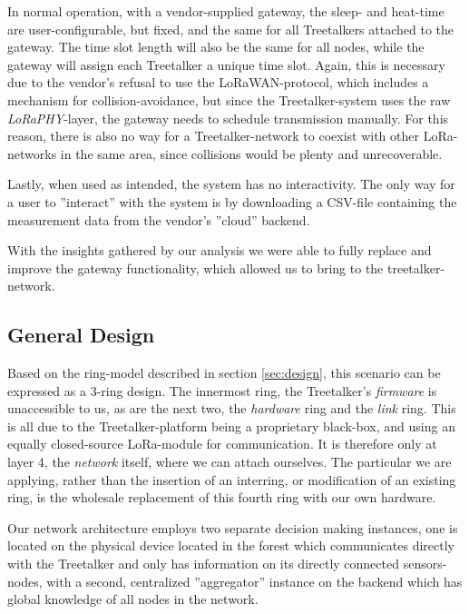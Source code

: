 In normal operation, with a vendor-supplied gateway, the sleep- and heat-time are user-configurable, but fixed, and the same for all Treetalkers attached to the gateway.
The time slot length will also be the same for all nodes, while the gateway will assign each Treetalker a unique time slot.
Again, this is necessary due to the vendor's refusal to use the LoRaWAN-protocol, which includes a mechanism for collision-avoidance, but since the Treetalker-system uses the raw \textit{LoRaPHY}-layer, the gateway needs to schedule transmission manually.
For this reason, there is also no way for a Treetalker-network to coexist with other LoRa-networks in the same area, since collisions would be plenty and unrecoverable.

Lastly, when used as intended, the system has no interactivity.
The only way for a user to ''interact'' with the system is by downloading a CSV-file containing the measurement data from the vendor's ''cloud'' backend.

With the insights gathered by our analysis we were able to fully replace and improve the gateway functionality, which allowed us to bring \mm to the treetalker-network.

\subsection{General Design}
\label{sec:treetalker:design}

Based on the ring-model described in section \ref{sec:design}, this scenario can be expressed as a 3-ring design.
The innermost ring, the Treetalker's \textit{firmware} is unaccessible to us, as are the next two, the \textit{hardware} ring and the \textit{link} ring.
This is all due to the Treetalker-platform being a proprietary black-box, and using an equally closed-source LoRa-module for communication.
It is therefore only at layer 4, the \textit{network} itself, where we can attach ourselves.
The particular \mm we are applying, rather than the insertion of an interring, or modification of an existing ring, is the wholesale replacement of this fourth ring with our own hardware.

Our network architecture employs two separate decision making instances, one is located on the physical device located in the forest which communicates directly with the Treetalker and only has information on its directly connected sensors-nodes, with a second, centralized ''aggregator'' instance on the backend which has global knowledge of all nodes in the network.

